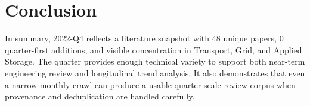 \documentclass[conference]{IEEEtran}
\begin{document}
\section{Conclusion}
In summary, 2022-Q4 reflects a literature snapshot with 48 unique papers, 0 quarter-first additions, and visible concentration in Transport, Grid, and Applied Storage. The quarter provides enough technical variety to support both near-term engineering review and longitudinal trend analysis. It also demonstrates that even a narrow monthly crawl can produce a usable quarter-scale review corpus when provenance and deduplication are handled carefully.



\end{document}
